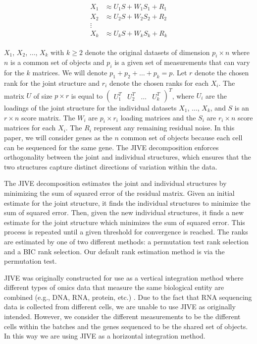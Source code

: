 \documentclass[unnumsec,webpdf,contemporary,large]{oup-authoring-template}%
\theoremstyle{thmstyleone}%
\theoremstyle{thmstyletwo}%
\theoremstyle{thmstylethree}%
\begin{document}
\begin{align}
    \begin{split}
    X_{1} &\approx U_{1} S + W_{1} S_{1} + R_{1} \\
    X_{2} &\approx U_{2} S + W_{2} S_{2} + R_{2} \\
    \vdots & \\
    X_{k} &\approx U_{k} S + W_{k} S_{k} + R_{k}
    \end{split}
\label{eq:jive_pca}
\end{align}

$X_1$, $X_2$, $\ldots$, $X_k$ with $k \ge 2$ denote the original datasets of dimension $p_i \times n$ where $n$ is a common set of objects and $p_i$ is a given set of measurements that can vary for the $k$ matrices. We will denote $p_1 + p_2 + \ldots + p_k = p$. Let $r$ denote the chosen rank for the joint structure and $r_i$ denote the chosen ranks for each $X_i$. The matrix $U$ of size $p \times r$ is equal to $ \begin{pmatrix} U_1^T & U_2^T & \hdots & U_k^T \end{pmatrix}^T $, where $U_i$ are the loadings of the joint structure for the individual datasets $X_1$, $\ldots$, $X_k$, and $S$ is an $r \times n$ score matrix. The $W_i$ are $p_i \times r_i$ loading matrices and the $S_i$ are $r_i \times n$ score matrices for each $X_i$. The $R_i$ represent any remaining residual noise. In this paper, we will consider genes as the $n$ common set of objects because each cell can be sequenced for the same gene. The JIVE decomposition enforces orthogonality between the joint and individual structures, which ensures that the two structures capture distinct directions of variation within the data.

The JIVE decomposition estimates the joint and individual structures by minimizing the sum of squared error of the residual matrix. Given an initial estimate for the joint structure, it finds the individual structures to minimize the sum of squared error. Then, given the new individual structures, it finds a new estimate for the joint structure which minimizes the sum of squared error. This process is repeated until a given threshold for convergence is reached. The ranks are estimated by one of two different methods: a permutation test rank selection and a BIC rank selection. Our default rank estimation method is via the permutation test.

JIVE was originally constructed for use as a vertical integration method where different types of omics data that measure the same biological entity are combined (e.g., DNA, RNA, protein, etc.) \cite{chen2013promise}. Due to the fact that RNA sequencing data is collected from different cells, we are unable to use JIVE as originally intended. However, we consider the different measurements to be the different cells within the batches and the genes sequenced to be the shared set of objects. In this way we are using JIVE as a horizontal integration method.
\end{document}
